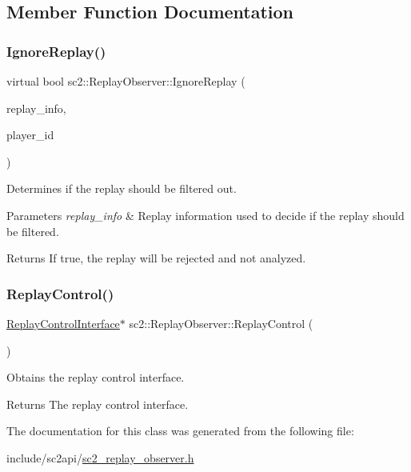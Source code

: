 \subsection{Member Function Documentation}
\mbox{\label{classsc2_1_1_replay_observer_a35461e606619ea1f2c968e37ab164d5d}} 
\subsubsection{\texorpdfstring{Ignore\+Replay()}{IgnoreReplay()}}
{\footnotesize\ttfamily virtual bool sc2\+::\+Replay\+Observer\+::\+Ignore\+Replay (\begin{DoxyParamCaption}\item[{const \hyperlink{structsc2_1_1_replay_info}{Replay\+Info} \&}]{replay\+\_\+info,  }\item[{uint32\+\_\+t \&}]{player\+\_\+id }\end{DoxyParamCaption})\hspace{0.3cm}{\ttfamily [virtual]}}

Determines if the replay should be filtered out. 
\begin{DoxyParams}{Parameters}
{\em replay\+\_\+info} & Replay information used to decide if the replay should be filtered. \\
\hline
\end{DoxyParams}
\begin{DoxyReturn}{Returns}
If \textquotesingle{}true\textquotesingle{}, the replay will be rejected and not analyzed. 
\end{DoxyReturn}
\mbox{\label{classsc2_1_1_replay_observer_a99198b2295dc998662b929f96ad17d65}} 
\subsubsection{\texorpdfstring{Replay\+Control()}{ReplayControl()}}
{\footnotesize\ttfamily \hyperlink{classsc2_1_1_replay_control_interface}{Replay\+Control\+Interface}$\ast$ sc2\+::\+Replay\+Observer\+::\+Replay\+Control (\begin{DoxyParamCaption}{ }\end{DoxyParamCaption})}

Obtains the replay control interface. \begin{DoxyReturn}{Returns}
The replay control interface. 
\end{DoxyReturn}


The documentation for this class was generated from the following file\+:\begin{DoxyCompactItemize}
\item 
include/sc2api/\hyperlink{sc2__replay__observer_8h}{sc2\+\_\+replay\+\_\+observer.\+h}\end{DoxyCompactItemize}
